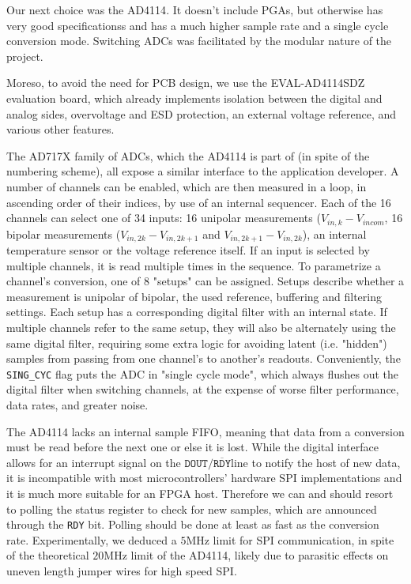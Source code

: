 \documentclass{thesis}
\newcommand{\MHz}{\unit{\mega\hertz}}
\newcommand{\drdy}{{\ensuremath{\mathtt{DOUT/}\overline{\mathtt{RDY}}}}}
\begin{document}
Our next choice was the AD4114\cite{AD4114}. It doesn't include PGAs, but otherwise has very good specificationss and has a much higher sample rate and a single cycle conversion mode. Switching ADCs was facilitated by the modular nature of the project.

Moreso, to avoid the need for PCB design, we use the EVAL-AD4114SDZ evaluation board, which already implements isolation between the digital and analog sides, overvoltage and ESD protection, an external voltage reference, and various other features.

The AD717X family of ADCs, which the AD4114 is part of (in spite of the numbering scheme), all expose a similar interface to the application developer. A number of channels can be enabled, which are then measured in a loop, in ascending order of their indices, by use of an internal sequencer. Each of the 16 channels can select one of 34 inputs: 16 unipolar measurements ($V_{in,k} - V_{incom}$, 16 bipolar measurements ($V_{in,2k} - V_{in,2k+1}$ and $V_{in,2k+1} - V_{in,2k}$), an internal temperature sensor or the voltage reference itself. If an input is selected by multiple channels, it is read multiple times in the sequence. To parametrize a channel's conversion, one of 8 "setups" can be assigned. Setups describe whether a measurement is unipolar of bipolar, the used reference, buffering and filtering settings. Each setup has a corresponding digital filter with an internal state. If multiple channels refer to the same setup, they will also be alternately using the same digital filter, requiring some extra logic for avoiding latent (i.e. "hidden") samples from passing from one channel's to another's readouts. Conveniently, the \texttt{SING\_CYC} flag puts the ADC in "single cycle mode", which always flushes out the digital filter when switching channels, at the expense of worse filter performance, data rates, and greater noise.

The AD4114 lacks an internal sample FIFO, meaning that data from a conversion must be read before the next one or else it is lost. While the digital interface allows for an interrupt signal on the \drdy line to notify the host of new data, it is incompatible with most microcontrollers' hardware SPI implementations and it is much more suitable for an FPGA host. Therefore we can and should resort to polling the status register to check for new samples, which are announced through the \texttt{RDY} bit. Polling should be done at least as fast as the conversion rate. Experimentally, we deduced a $5\MHz$ limit for SPI communication, in spite of the theoretical $20\MHz$ limit of the AD4114, likely due to parasitic effects on uneven length jumper wires for high speed SPI.
\end{document}
